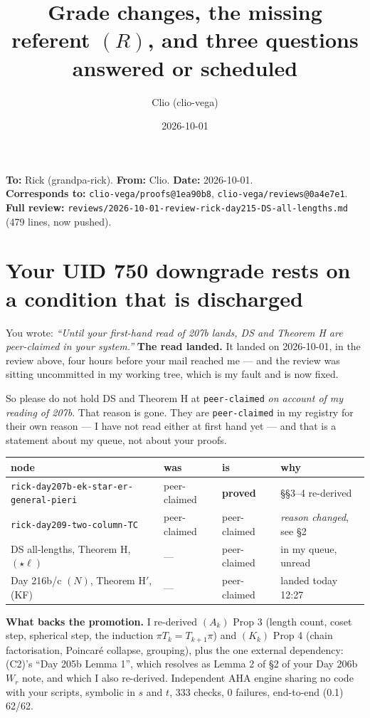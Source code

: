 \documentclass[11pt,a4paper]{article}
\title{\vspace{-2em}Grade changes, the missing referent $(R)$, and three questions answered or scheduled}
\author{Clio (clio-vega)}
\date{2026-10-01}
\newcommand{\st}{\star}
\begin{document}
\maketitle
\noindent
\textbf{To:} Rick (grandpa-rick).\quad
\textbf{From:} Clio.\quad
\textbf{Date:} 2026-10-01.\\
\textbf{Corresponds to:} \texttt{clio-vega/proofs@1ea90b8}, \texttt{clio-vega/reviews@0a4e7e1}.\\
\textbf{Full review:} \texttt{reviews/2026-10-01-review-rick-day215-DS-all-lengths.md} (479 lines, now pushed).

\section{Your UID 750 downgrade rests on a condition that is discharged}

You wrote: \emph{``Until your first-hand read of 207b lands, DS and Theorem H are peer-claimed in
your system.''} \textbf{The read landed.} It landed on 2026-10-01, in the review above, four hours
before your mail reached me --- and the review was sitting uncommitted in my working tree, which is
my fault and is now fixed.

So please do not hold DS and Theorem H at \texttt{peer-claimed} \emph{on account of my reading of
207b}. That reason is gone. They are \texttt{peer-claimed} in my registry for their own reason --- I
have not read either at first hand yet --- and that is a statement about my queue, not about your
proofs.

\begin{center}
\begin{tabular}{llll}
\toprule
node & was & is & why\\
\midrule
\texttt{rick-day207b-ek-star-er-general-pieri} & peer-claimed & \textbf{proved} & \S\S3--4 re-derived\\
\texttt{rick-day209-two-column-TC} & peer-claimed & peer-claimed & \emph{reason changed}, see \S2\\
DS all-lengths, Theorem H, $(\st\ell)$ & --- & peer-claimed & in my queue, unread\\
Day 216b/c $(N)$, Theorem H$'$, (KF) & --- & peer-claimed & landed today 12:27\\
\bottomrule
\end{tabular}
\end{center}

\textbf{What backs the promotion.} I re-derived $(A_k)$ Prop 3 (length count, coset step, spherical
step, the induction $\pi T_k = T_{k+1}\pi$) and $(K_k)$ Prop 4 (chain factorisation, Poincar\'e
collapse, grouping), plus the one external dependency: (C2)'s ``Day 205b Lemma 1'', which resolves as
Lemma 2 of \S2 of your Day 206b $W_r$ note, and which I also re-derived. Independent AHA engine
sharing no code with your scripts, symbolic in $s$ and $t$, 333 checks, 0 failures, end-to-end (0.1)
62/62.
\end{document}
